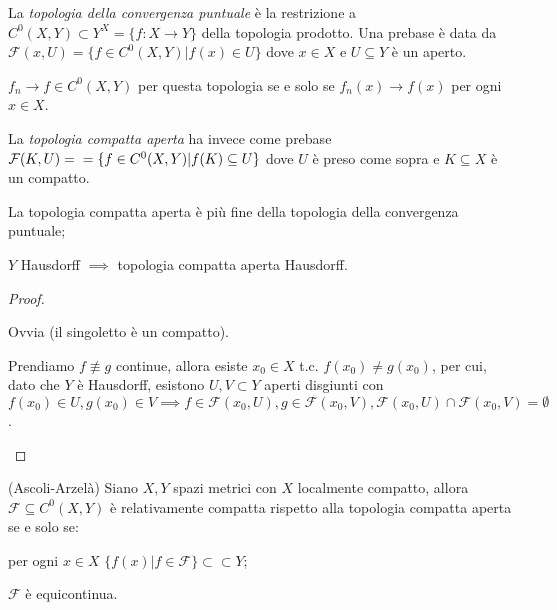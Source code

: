La \textit{topologia della convergenza puntuale} è la restrizione a $C^0(X, Y) \subset Y^X=\{f:X \rightarrow Y\}$ della topologia prodotto. Una prebase è data da $\mathcal{F}(x, U)=\{f \in C^0(X, Y) |f(x) \in U\}$ dove $x \in X$ e $U \subseteq Y$ è un aperto.

\begin{exc}
  $f_n \rightarrow f \in C^0(X, Y)$ per questa topologia se e solo se $f_n(x) \rightarrow f(x)$ per ogni $x \in X$.
\end{exc}

La \textit{topologia compatta aperta} ha invece come prebase $\mathcal{F}(K, U)= \\ =\{f \in C^0(X, Y) | f(K) \subseteq U\}$ dove $U$ è preso come sopra e $K \subseteq X$ è un compatto.

\begin{prop}
  \begin{nlist}
    \item La topologia compatta aperta è più fine della topologia della convergenza puntuale;
    \item $Y$ Hausdorff $\implies$ topologia compatta aperta Hausdorff.
  \end{nlist}
\end{prop}

\begin{proof}
  \begin{nlist}
    \item Ovvia (il singoletto è un compatto).
    \item Prendiamo $f \not\equiv g$ continue, allora esiste $x_0 \in X$ t.c. $f(x_0) \not= g(x_0)$, per cui, dato che $Y$ è Hausdorff,
    esistono $U, V \subset Y$ aperti disgiunti con $f(x_0) \in U, g(x_0) \in V \implies f \in \mathcal{F}(x_0, U), g \in \mathcal{F}(x_0, V), \mathcal{F}(x_0, U) \cap \mathcal{F}(x_0, V)=\emptyset$.
  \end{nlist}
\end{proof}

\begin{thm}
  (Ascoli-Arzelà) Siano $X, Y$ spazi metrici con $X$ localmente compatto, allora $\mathcal{F} \subseteq C^0(X, Y)$ è relativamente compatta rispetto alla topologia compatta aperta se e solo se:
  \begin{nlist}
    \item per ogni $x \in X$ $\{f(x) | f \in \mathcal{F}\} \subset \subset Y$;
    \item $\mathcal{F}$ è equicontinua.
  \end{nlist}
\end{thm}

